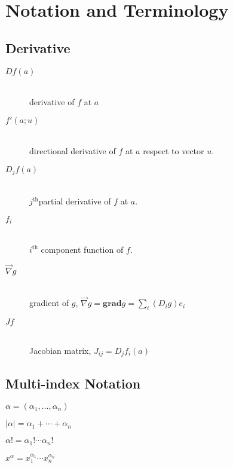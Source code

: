 \section{Notation and Terminology}

\subsection{Derivative}

\begin{description}
	\item[$Df(a)$] \hfill \\
		derivative of $f$ at $a$
		
	\item[$f'(a;u)$] \hfill \\
		directional derivative of $f$ at $a$ respect to vector $u$.
		
	\item[$D_jf(a)$] \hfill \\
		$j^\textrm{th}$partial derivative of $f$ at $a$.

	\item[$f_i$] \hfill \\
		$i^\textrm{th}$ component function of $f$.

	\item[$\vec\nabla g$] \hfill \\
		gradient of $g$, $\vec\nabla g = \mathbf{grad} g = \sum_i (D_ig)e_i$

	\item[$J f$] \hfill \\
		Jacobian matrix, $J_{ij} = D_jf_i(a)$
\end{description}

\subsection{Multi-index Notation}
\label{multiindex}

	$\alpha = (\alpha_1, \ldots, \alpha_n)$
	
	$|\alpha| = \alpha_1 + \cdots + \alpha_n$
	
	$\alpha! = \alpha_1! \cdots \alpha_n!$
	
	$x^\alpha = x_1^{\alpha_1} \cdots x_n^{\alpha_n}$